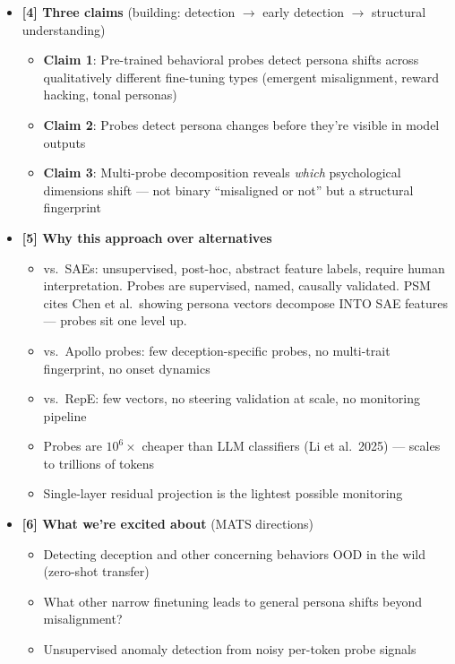 \documentclass[11pt]{article}
\begin{document}
\begin{itemize}
  \item \textbf{[4] Three claims} (building: detection $\rightarrow$ early detection $\rightarrow$ structural understanding)
  \begin{itemize}
    \item \textbf{Claim 1}: Pre-trained behavioral probes detect persona shifts across qualitatively different fine-tuning types (emergent misalignment, reward hacking, tonal personas)
    \item \textbf{Claim 2}: Probes detect persona changes before they're visible in model outputs
    \item \textbf{Claim 3}: Multi-probe decomposition reveals \emph{which} psychological dimensions shift --- not binary ``misaligned or not'' but a structural fingerprint
  \end{itemize}

  \item \textbf{[5] Why this approach over alternatives}
  \begin{itemize}
    \item vs.\ SAEs: unsupervised, post-hoc, abstract feature labels, require human interpretation. Probes are supervised, named, causally validated. PSM cites Chen et al.\ showing persona vectors decompose INTO SAE features --- probes sit one level up.
    \item vs.\ Apollo probes: few deception-specific probes, no multi-trait fingerprint, no onset dynamics
    \item vs.\ RepE: few vectors, no steering validation at scale, no monitoring pipeline
    \item Probes are $10^6\times$ cheaper than LLM classifiers (Li et al.\ 2025) --- scales to trillions of tokens
    \item Single-layer residual projection is the lightest possible monitoring
  \end{itemize}

  \item \textbf{[6] What we're excited about} (MATS directions)
  \begin{itemize}
    \item Detecting deception and other concerning behaviors OOD in the wild (zero-shot transfer)
    \item What other narrow finetuning leads to general persona shifts beyond misalignment?
    \item Unsupervised anomaly detection from noisy per-token probe signals
  \end{itemize}
\end{itemize}
\end{document}
